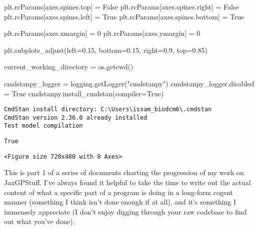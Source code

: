 \documentclass[
  letterpaper,
  DIV=11,
  numbers=noendperiod]{scrartcl}
\newenvironment{Shaded}{\begin{snugshade}}{\end{snugshade}}
\newcommand{\DecValTok}[1]{\textcolor[rgb]{0.68,0.00,0.00}{#1}}
\newcommand{\FloatTok}[1]{\textcolor[rgb]{0.68,0.00,0.00}{#1}}
\newcommand{\NormalTok}[1]{\textcolor[rgb]{0.00,0.23,0.31}{#1}}
\newcommand{\OperatorTok}[1]{\textcolor[rgb]{0.37,0.37,0.37}{#1}}
\newcommand{\StringTok}[1]{\textcolor[rgb]{0.13,0.47,0.30}{#1}}
\newcommand{\VariableTok}[1]{\textcolor[rgb]{0.07,0.07,0.07}{#1}}
\begin{document}
\begin{Shaded}
\begin{Highlighting}[]
\NormalTok{plt.rcParams[}\StringTok{\textquotesingle{}axes.spines.top\textquotesingle{}}\NormalTok{] }\OperatorTok{=} \VariableTok{False}
\NormalTok{plt.rcParams[}\StringTok{\textquotesingle{}axes.spines.right\textquotesingle{}}\NormalTok{] }\OperatorTok{=} \VariableTok{False}
\NormalTok{plt.rcParams[}\StringTok{\textquotesingle{}axes.spines.left\textquotesingle{}}\NormalTok{] }\OperatorTok{=} \VariableTok{True}
\NormalTok{plt.rcParams[}\StringTok{\textquotesingle{}axes.spines.bottom\textquotesingle{}}\NormalTok{] }\OperatorTok{=} \VariableTok{True}

\NormalTok{plt.rcParams[}\StringTok{\textquotesingle{}axes.xmargin\textquotesingle{}}\NormalTok{] }\OperatorTok{=} \DecValTok{0}
\NormalTok{plt.rcParams[}\StringTok{\textquotesingle{}axes.ymargin\textquotesingle{}}\NormalTok{] }\OperatorTok{=} \DecValTok{0}

\NormalTok{plt.subplots\_adjust(left}\OperatorTok{=}\FloatTok{0.15}\NormalTok{, bottom}\OperatorTok{=}\FloatTok{0.15}\NormalTok{, right}\OperatorTok{=}\FloatTok{0.9}\NormalTok{, top}\OperatorTok{=}\FloatTok{0.85}\NormalTok{)}

\NormalTok{current\_working\_directory }\OperatorTok{=}\NormalTok{ os.getcwd()}

\NormalTok{cmdstanpy\_logger }\OperatorTok{=}\NormalTok{ logging.getLogger(}\StringTok{"cmdstanpy"}\NormalTok{)}
\NormalTok{cmdstanpy\_logger.disabled }\OperatorTok{=} \VariableTok{True}
\NormalTok{cmdstanpy.install\_cmdstan(compiler}\OperatorTok{=}\VariableTok{True}\NormalTok{)}
\end{Highlighting}
\end{Shaded}

\begin{verbatim}
CmdStan install directory: C:\Users\issam_biodcm6\.cmdstan
CmdStan version 2.36.0 already installed
Test model compilation
\end{verbatim}

\begin{verbatim}
True
\end{verbatim}

\begin{verbatim}
<Figure size 720x480 with 0 Axes>
\end{verbatim}

This is part 1 of a series of documents charting the progression of my
work on JaxGPStuff. I've always found it helpful to take the time to
write out the actual content of what a specific part of a program is
doing in a long-form cogent manner (something I think isn't done enough
if at all), and it's something I immensely appreciate (I don't enjoy
digging through your raw codebase to find out what you've done).
\end{document}

